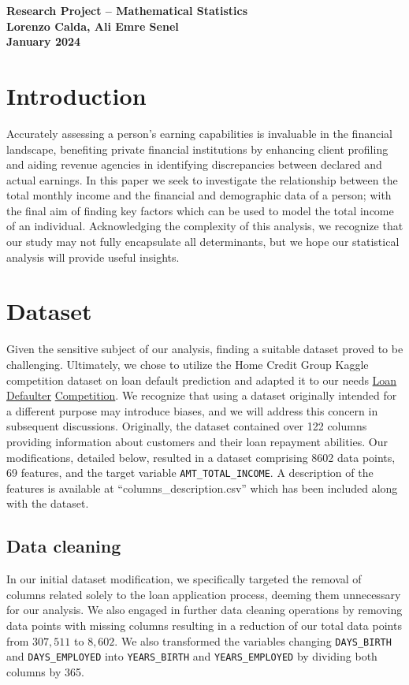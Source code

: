 \documentclass[hidelinks,12pt]{article}
\begin{document}
\begin{center}
  \textbf{Research Project – Mathematical Statistics}\\[0pt]
  \textbf{Lorenzo Calda, Ali Emre Senel}\\[0pt]
\textbf{January 2024}
\end{center}

\section{Introduction}
Accurately assessing a person's earning capabilities is invaluable in the financial landscape, benefiting private financial institutions by enhancing client profiling and aiding revenue agencies in identifying discrepancies between declared and actual earnings. In this paper we seek to investigate the relationship between the total monthly income and the financial and demographic data of a person; with the final aim of finding key factors which can be used to model the total income of an individual. Acknowledging the complexity of this analysis, we recognize that our study may not fully encapsulate all determinants, but we hope our statistical analysis will provide useful insights.

\section{Dataset}
Given the sensitive subject of our analysis, finding a suitable dataset proved to be challenging. Ultimately, we chose to utilize the Home Credit Group Kaggle competition dataset on loan default prediction and adapted it to our needs \cite{loan-defaulter} \cite{home-credit-default-risk} \href{https://www.kaggle.com/datasets/gauravduttakiit/loan-defaulter}{Loan Defaulter} \href{https://www.kaggle.com/c/home-credit-default-risk}{Competition}. We recognize that using a dataset originally intended for a different purpose may introduce biases, and we will address this concern in subsequent discussions. Originally, the dataset contained over 122 columns providing information about customers and their loan repayment abilities. Our modifications, detailed below, resulted in a dataset comprising 8602 data points, 69 features, and the target variable \verb|AMT_TOTAL_INCOME|. A description of the features is available at ``columns\_description.csv'' which has been included along with the dataset.

\subsection{Data cleaning}
In our initial dataset modification, we specifically targeted the removal of columns related solely to the loan application process, deeming them unnecessary for our analysis. We also engaged in further data cleaning operations by removing data points with missing columns resulting in a reduction of our total data points from $307,511$ to $8,602$. We also transformed the variables changing \verb|DAYS_BIRTH| and \verb|DAYS_EMPLOYED| into \verb|YEARS_BIRTH| and \verb|YEARS_EMPLOYED| by dividing both columns by 365.
\end{document}
